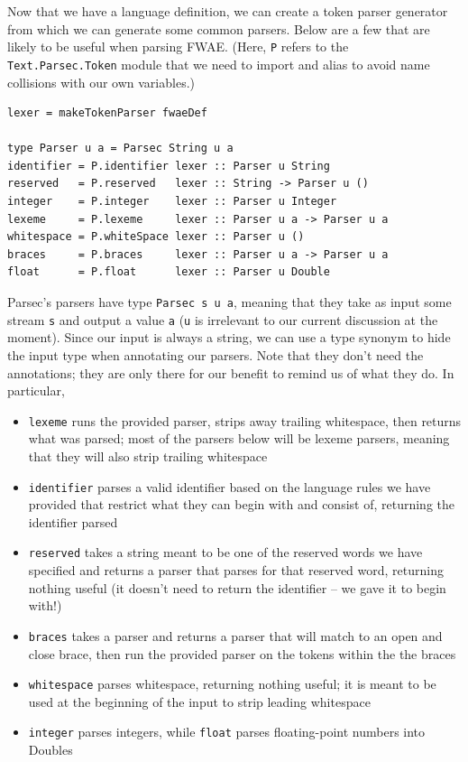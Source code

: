 \documentclass[format=acmlarge, review=false, nonacm=false, screen=true]{acmart}
\begin{document}
Now that we have a language definition, we can create a token parser generator from which we can generate some common parsers. Below are a few that are likely to be useful when parsing FWAE. (Here, \texttt{P} refers to the \texttt{Text.Parsec.Token} module that we need to import and alias to avoid name collisions with our own variables.)
\begin{verbatim}
lexer = makeTokenParser fwaeDef

type Parser u a = Parsec String u a
identifier = P.identifier lexer :: Parser u String
reserved   = P.reserved   lexer :: String -> Parser u ()
integer    = P.integer    lexer :: Parser u Integer
lexeme     = P.lexeme     lexer :: Parser u a -> Parser u a
whitespace = P.whiteSpace lexer :: Parser u ()
braces     = P.braces     lexer :: Parser u a -> Parser u a
float      = P.float      lexer :: Parser u Double
\end{verbatim}
Parsec's parsers have type \texttt{Parsec s u a}, meaning that they take as input some stream \texttt{s} and output a value \texttt{a} (\texttt{u} is irrelevant to our current discussion at the moment). Since our input is always a string, we can use a type synonym to hide the input type when annotating our parsers. Note that they don't need the annotations; they are only there for our benefit to remind us of what they do. In particular,
\begin{itemize}
    \item \texttt{lexeme} runs the provided parser, strips away trailing whitespace, then returns what was parsed; most of the parsers below will be lexeme parsers, meaning that they will also strip trailing whitespace
    \item \texttt{identifier} parses a valid identifier based on the language rules we have provided that restrict what they can begin with and consist of, returning the identifier parsed
    \item \texttt{reserved} takes a string meant to be one of the reserved words we have specified and returns a parser that parses for that reserved word, returning nothing useful (it doesn't need to return the identifier -- we gave it to begin with!)
    \item \texttt{braces} takes a parser and returns a parser that will match to an open and close brace, then run the provided parser on the tokens within the the braces
    \item \texttt{whitespace} parses whitespace, returning nothing useful; it is meant to be used at the beginning of the input to strip leading whitespace
    \item \texttt{integer} parses integers, while \texttt{float} parses floating-point numbers into Doubles
\end{itemize}
\end{document}
